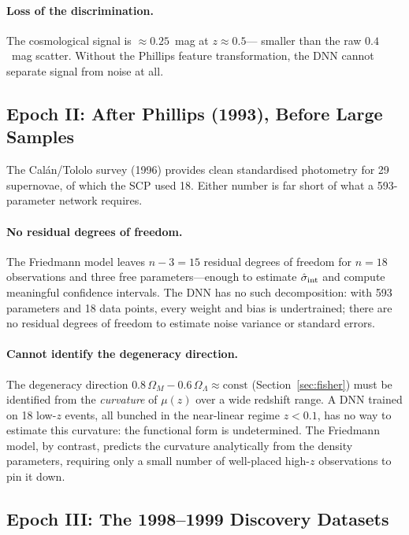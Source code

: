 \documentclass[12pt]{article}
\begin{document}
\paragraph{Loss of the discrimination.}
The cosmological signal is $\approx 0.25$~mag at $z \approx 0.5$---
smaller than the raw $0.4$~mag scatter.  Without the Phillips feature
transformation, the DNN cannot separate signal from noise at all.

\subsection{Epoch II: After Phillips (1993), Before Large Samples}

The Cal\'an/Tololo survey (1996) provides clean standardised photometry for
29 supernovae, of which the SCP used 18.  Either number is far short of what a
593-parameter network requires.

\paragraph{No residual degrees of freedom.}
The Friedmann model leaves $n - 3 = 15$ residual degrees of freedom for
$n = 18$ observations and three free parameters---enough to estimate
$\hat\sigma_{\rm int}$ and compute meaningful confidence intervals.
The DNN has no such decomposition: with 593 parameters and 18 data points,
every weight and bias is undertrained; there are no residual degrees
of freedom to estimate noise variance or standard errors.

\paragraph{Cannot identify the degeneracy direction.}
The degeneracy direction $0.8\,\Omega_M - 0.6\,\Omega_\Lambda \approx
\text{const}$ (Section~\ref{sec:fisher}) must be identified from the
\emph{curvature} of $\mu(z)$ over a wide redshift range.  A DNN trained
on 18 low-$z$ events, all bunched in the near-linear regime $z < 0.1$,
has no way to estimate this curvature: the functional form is undetermined.
The Friedmann model, by contrast, predicts the curvature analytically
from the density parameters, requiring only a small number of well-placed
high-$z$ observations to pin it down.

\subsection{Epoch III: The 1998--1999 Discovery Datasets}
\end{document}
